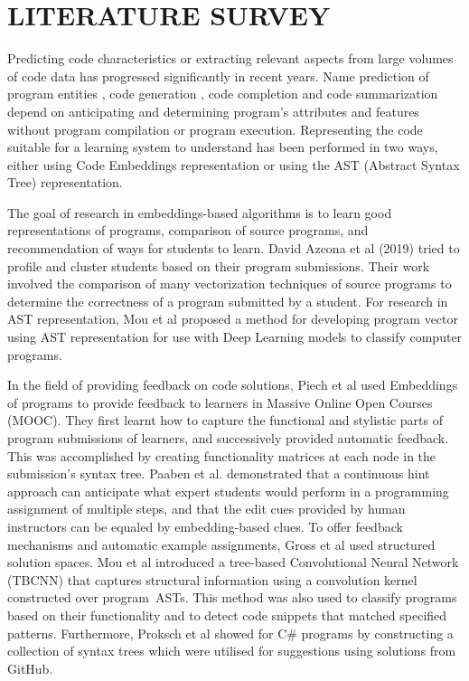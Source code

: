 
\chapter{LITERATURE SURVEY} %

Predicting code characteristics or extracting relevant
aspects from large volumes of code data has progressed
significantly in recent years. Name
prediction of program entities \cite{I}, code generation
\cite{J}, code completion \cite{K} and code summarization
\cite{L} depend on anticipating and determining program's attributes and features without program compilation or program execution. Representing the code suitable for a learning
system to understand has been performed in two ways, either
using Code Embeddings representation or using the AST
(Abstract Syntax Tree) representation.

The goal of research in embeddings-based algorithms is to
learn good representations of programs, comparison of source programs, and
recommendation of ways for students to learn. David Azcona et al (2019)
\cite{A} tried to profile and cluster students based on their program submissions. Their work involved the comparison of many vectorization techniques of source programs to determine
the correctness of a program submitted by a student. For research in AST
representation, Mou et al \cite{M} proposed a method for
developing program vector using AST representation for use
with Deep Learning models to classify computer
programs. 

In the field of providing feedback on code solutions, Piech
et al \cite{N} used Embeddings of programs to provide feedback to learners in Massive Online Open Courses (MOOC). They first
learnt how to capture the functional and stylistic parts of
program submissions of learners, and successively provided
automatic feedback. This was accomplished by creating
functionality matrices at each node in the submission's
syntax tree. Paaben et al. \cite{O} demonstrated that a continuous hint approach can anticipate what expert students would perform in a programming assignment of multiple steps, and that the edit cues provided by human instructors can be equaled by embedding-based clues.
To offer feedback mechanisms and automatic example assignments, Gross et al \cite{P} used structured solution
spaces. Mou et al \cite{Q} introduced a tree-based
Convolutional Neural Network (TBCNN) that captures structural
information using a convolution kernel constructed over
program ASTs. This method was also used to classify programs based on their functionality and to detect code snippets that matched specified patterns. Furthermore, Proksch et al
\cite{R} showed for C\# programs by constructing a collection of syntax trees which were utilised for suggestions using solutions from GitHub.

